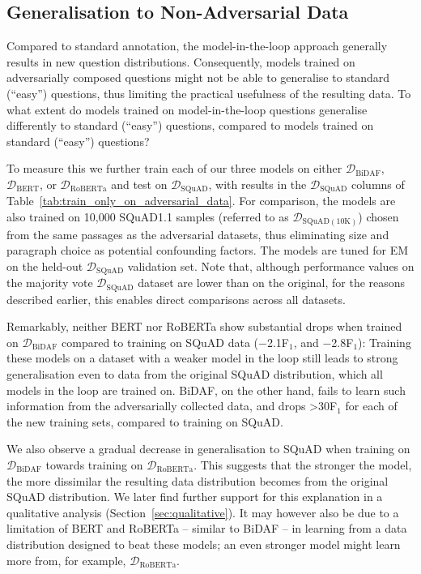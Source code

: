 \documentclass[11pt,a4paper]{article}
\newcommand{\dataset}[1]{\ensuremath{\mathcal{D_{\mathrm{#1}}}}}
\newcommand{\squad}{SQuAD}
\newcommand{\squadone}{SQuAD1.1}
\newif\ifpagebreaks
\begin{document}
\subsection{Generalisation to Non-Adversarial Data}
Compared to standard annotation, the model-in-the-loop approach generally results in new question distributions.
Consequently, models trained on adversarially composed questions might not be able to generalise to standard (``easy'') questions, thus limiting the practical usefulness of the resulting data.
To what extent do models trained on model-in-the-loop questions generalise differently to standard (``easy'') questions, compared to models trained on standard (``easy'') questions?


\ifpagebreaks
    \pagebreak
\fi
To measure this we further train each of our three models on either \dataset{BiDAF}, \dataset{BERT}, or \dataset{RoBERTa} and test on \dataset{SQuAD}, with results in the \dataset{SQuAD} columns of Table~\ref{tab:train_only_on_adversarial_data}.
For comparison, the models are also trained on 10,000 \squadone{} samples (referred to as \dataset{SQuAD(10K)}) chosen from the same passages as the adversarial datasets, thus eliminating size and paragraph choice as potential confounding factors.
The models are tuned for EM on the held-out \dataset{SQuAD} validation set. 
Note that, although performance values on the majority vote \dataset{SQuAD} dataset are lower than on the original, for the reasons described earlier, this enables direct comparisons across all datasets.


Remarkably, neither BERT nor RoBERTa show substantial drops when trained on \dataset{BiDAF} compared to training on \squad{} data ($-$2.1F$_\text{1}$, and $-$2.8F$_\text{1}$):
Training these models on a dataset with a weaker model in the loop still leads to strong generalisation even to data from the original \squad{} distribution, which all models in the loop are trained on.
BiDAF, on the other hand, fails to learn such information from the adversarially collected data, and drops >30F$_\text{1}$ for each of the new training sets, compared to training on \squad{}.

We also observe a gradual decrease in generalisation to \squad{} when training on \dataset{BiDAF} towards training on \dataset{RoBERTa}.
This suggests that the stronger the model, the more dissimilar the resulting data distribution becomes from the original \squad{} distribution.
We later find further support for this explanation in a qualitative analysis (Section~\ref{sec:qualitative}).
It may however also be due to a limitation of BERT and RoBERTa -- similar to BiDAF -- in learning from a data distribution designed to beat these models; an even stronger model might learn more from, for example, \dataset{RoBERTa}.
\end{document}
